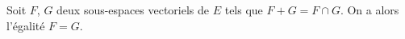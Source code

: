 Soit $F$, $G$ deux sous-espaces vectoriels de $E$ tels que $F+G=F\cap G$. On a alors l'égalité $F=G$.

\begin{reponses}
\end{reponses}

